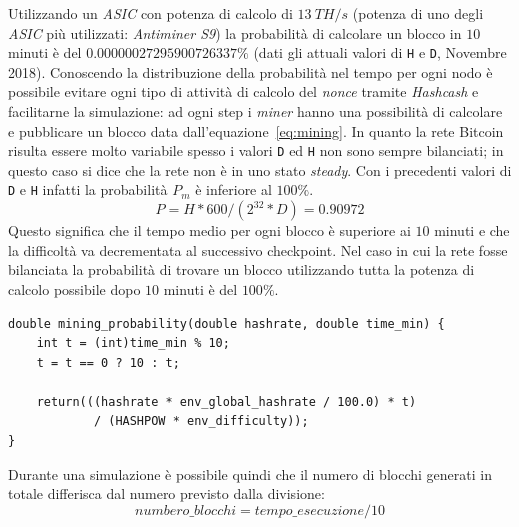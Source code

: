 Utilizzando un \textit{ASIC} con potenza di calcolo di $13~TH/s$ (potenza di uno degli \textit{ASIC} più utilizzati: \textit{Antiminer S9}) la probabilità di calcolare un blocco in $10$ minuti è del $0.00000027295900726337\%$ (dati gli attuali valori di \texttt{H} e \texttt{D}, Novembre 2018).\newline
Conoscendo la distribuzione della probabilità nel tempo per ogni nodo è possibile evitare ogni tipo di attività di calcolo del \textit{nonce} tramite \textit{Hashcash} e facilitarne la simulazione: ad ogni step i \textit{miner} hanno una possibilità di calcolare e pubblicare un blocco data dall'equazione~\ref{eq:mining}.
In quanto la rete Bitcoin risulta essere molto variabile spesso i valori \texttt{D} ed \texttt{H} non sono sempre bilanciati; in questo caso si dice che la rete non è in uno stato \textit{steady}. Con i precedenti valori di \texttt{D} e \texttt{H} infatti la probabilità $P_m$ è inferiore al $100\%$.
\begin{equation}
    P = H * 600 / (2^{32} * D) = 0.90972%
\end{equation}
Questo significa che il tempo medio per ogni blocco è superiore ai $10$ minuti e che la difficoltà va decrementata al successivo checkpoint.
Nel caso in cui la rete fosse bilanciata la probabilità di trovare un blocco utilizzando tutta la potenza di calcolo possibile dopo $10$ minuti è del $100\%$.
\clearpage
\begin{code}
\begin{verbatim}
double mining_probability(double hashrate, double time_min) {
    int t = (int)time_min % 10;
    t = t == 0 ? 10 : t;

    return(((hashrate * env_global_hashrate / 100.0) * t)
            / (HASHPOW * env_difficulty));
}
\end{verbatim}
Durante una simulazione è possibile quindi che il numero di blocchi generati in totale differisca dal numero previsto dalla divisione:
\begin{equation}
    numbero\_blocchi = tempo\_esecuzione/10
\end{equation}
\end{code}
